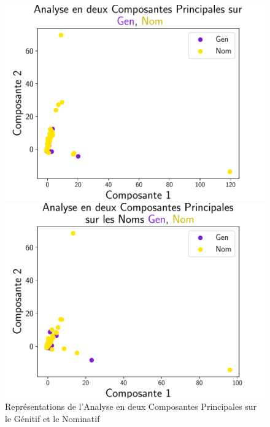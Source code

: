 \documentclass{cours}
\begin{document}
\begin{figure}
	\begin{minipage}{.5\textwidth}
	\begin{center}
	\includegraphics[width=\linewidth]{Figures/Visualisations/pca_Gen_Nom}
	\end{center}
	\end{minipage}
	\begin{minipage}{.5\textwidth}
	\begin{center}
	\includegraphics[width=\linewidth]{Figures/Visualisations/pca_Gen_Nom_Nouns}
	\end{center}
	\end{minipage}
	\caption{Représentations de l'Analyse en deux Composantes Principales sur le Génitif et le Nominatif}
	\label{fig:pca}
\end{figure}
\end{document}
